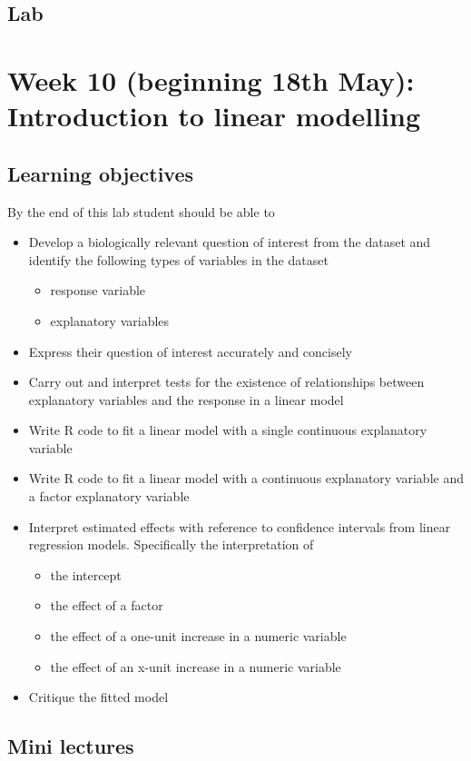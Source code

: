 \documentclass{article}
\begin{document}
\subsection*{Lab}


\section*{Week 10 (beginning 18th May): Introduction to linear modelling}
\subsection*{Learning objectives}
By the end of this lab student should be able to
\begin{itemize}
\item Develop a biologically relevant question of interest  from the dataset and identify the following types of variables in the dataset
  \begin{itemize}
  \item response variable
  \item explanatory variables
  \end{itemize}
\item Express their question of interest accurately and concisely
\item Carry out and interpret tests for the existence of relationships between explanatory variables and the response in a linear model
\item Write R code to fit a linear model with a single continuous explanatory variable
\item Write R code to fit a linear model with a continuous explanatory variable and a factor explanatory variable
\item Interpret estimated effects with reference to confidence intervals from linear regression models. Specifically the interpretation of
  \begin{itemize}
  \item the intercept
  \item the effect of a factor
  \item the effect of a one-unit increase in a numeric variable
  \item the effect of an x-unit increase in a numeric variable
  \end{itemize}
\item Critique the fitted model
\end{itemize}

\subsection*{Mini lectures}
\end{document}
